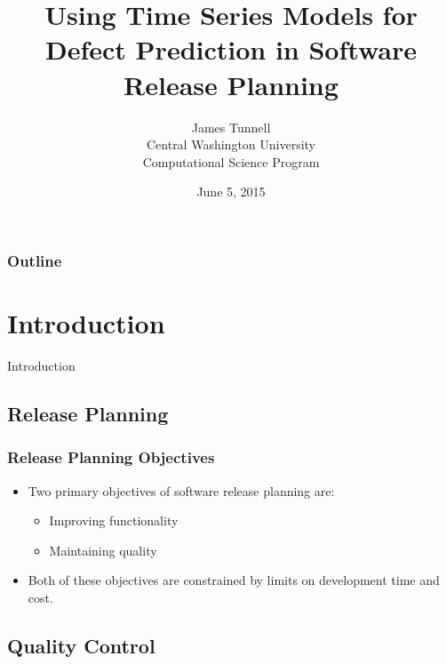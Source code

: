 \documentclass[presentation]{beamer}
\begin{document}
\title{Using Time Series Models for Defect Prediction in Software Release Planning}
\author{James Tunnell \\
Central Washington University \\
Computational Science Program}
\date{June 5, 2015}

\begin{frame}
\titlepage
\end{frame}

\begin{frame}
\small{
\frametitle{Outline}
\tableofcontents[hideallsubsections] 
}
\end{frame}

\section{Introduction}

\begin{frame}
\begin{center}
\Large{Introduction}
\end{center}
\end{frame}

\subsection{Release Planning}

\begin{frame}[t]
\frametitle{Release Planning Objectives}
\begin{itemize}
\item{Two primary objectives of software release planning are:
  \begin{itemize}
    \item{Improving functionality}
    \item{Maintaining quality}
  \end{itemize}}
  \item{Both of these objectives are constrained by limits on development time and cost.}
\end{itemize}
\end{frame}

\subsection{Quality Control}
\end{document}

